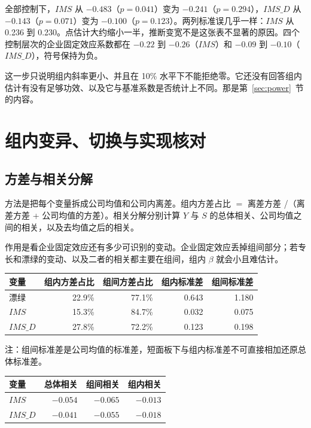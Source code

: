 \documentclass[11pt]{article}
\begin{document}
全部控制下，\(IMS\) 从 \(-0.483\)（\(p=0.041\)）变为 \(-0.241\)（\(p=0.294\)），\(IMS\_D\) 从 \(-0.143\)（\(p=0.071\)）变为 \(-0.100\)（\(p=0.123\)）。两列标准误几乎一样：\(IMS\) 从 0.236 到 0.230。点估计大约缩小一半，推断变宽不是这张表不显著的原因。四个控制层次的企业固定效应系数都在 \(-0.22\) 到 \(-0.26\)（\(IMS\)）和 \(-0.09\) 到 \(-0.10\)（\(IMS\_D\)），符号保持为负。

这一步只说明组内斜率更小、并且在 10\% 水平下不能拒绝零。它还没有回答组内估计有没有足够功效、以及它与基准系数是否统计上不同。那是第~\ref{sec:power}~节的内容。

\section{组内变异、切换与实现核对}
\label{sec:diag}

\subsection{方差与相关分解}

方法是把每个变量拆成公司均值和公司内离差。组内方差占比 \(=\) 离差方差 /（离差方差 + 公司均值的方差）。相关分解分别计算 \(Y\) 与 \(S\) 的总体相关、公司均值之间的相关，以及去均值之后的相关。

作用是看企业固定效应还有多少可识别的变动。企业固定效应丢掉组间部分；若专长和漂绿的变动、以及二者的相关都主要在组间，组内 \(\beta\) 就会小且难估计。

\begin{center}
\begin{threeparttable}
\caption{方差分解（共同样本）}
\label{tab:var}
\begin{tabular}{lrrrr}
\toprule
变量 & 组内方差占比 & 组间方差占比 & 组内标准差 & 组间标准差 \\
\midrule
漂绿 & 22.9\% & 77.1\% & 0.643 & 1.180 \\
\(IMS\) & 15.3\% & 84.7\% & 0.032 & 0.075 \\
\(IMS\_D\) & 27.8\% & 72.2\% & 0.123 & 0.198 \\
\bottomrule
\end{tabular}
\begin{tablenotes}\footnotesize
\item 注：组间标准差是公司均值的标准差，短面板下与组内标准差不可直接相加还原总体标准差。
\end{tablenotes}
\end{threeparttable}
\end{center}

\begin{center}
\begin{threeparttable}
\caption{漂绿与专长的相关分解}
\label{tab:corr}
\begin{tabular}{lrrr}
\toprule
变量 & 总体相关 & 组间相关 & 组内相关 \\
\midrule
\(IMS\) & \(-0.054\) & \(-0.065\) & \(-0.013\) \\
\(IMS\_D\) & \(-0.041\) & \(-0.055\) & \(-0.018\) \\
\bottomrule
\end{tabular}
\end{threeparttable}
\end{center}
\end{document}
